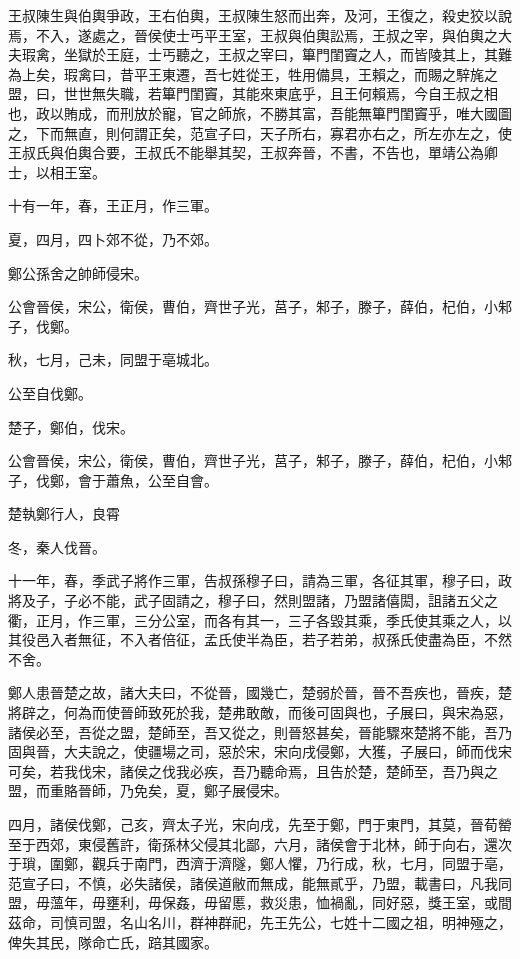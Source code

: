 \begin{pinyinscope}
王叔陳生與伯輿爭政，王右伯輿，王叔陳生怒而出奔，及河，王復之，殺史狡以說焉，不入，遂處之，晉侯使士丐平王室，王叔與伯輿訟焉，王叔之宰，與伯輿之大夫瑕禽，坐獄於王庭，士丐聽之，王叔之宰曰，篳門閨竇之人，而皆陵其上，其難為上矣，瑕禽曰，昔平王東遷，吾七姓從王，牲用備具，王賴之，而賜之騂旄之盟，曰，世世無失職，若篳門閨竇，其能來東底乎，且王何賴焉，今自王叔之相也，政以賄成，而刑放於寵，官之師旅，不勝其富，吾能無篳門閨竇乎，唯大國圖之，下而無直，則何謂正矣，范宣子曰，天子所右，寡君亦右之，所左亦左之，使王叔氏與伯輿合要，王叔氏不能舉其契，王叔奔晉，不書，不告也，單靖公為卿士，以相王室。

十有一年，春，王正月，作三軍。

夏，四月，四卜郊不從，乃不郊。

鄭公孫舍之帥師侵宋。

公會晉侯，宋公，衛侯，曹伯，齊世子光，莒子，邾子，滕子，薛伯，杞伯，小邾子，伐鄭。

秋，七月，己未，同盟于亳城北。

公至自伐鄭。

楚子，鄭伯，伐宋。

公會晉侯，宋公，衛侯，曹伯，齊世子光，莒子，邾子，滕子，薛伯，杞伯，小邾子，伐鄭，會于蕭魚，公至自會。

楚執鄭行人，良霄

冬，秦人伐晉。

十一年，春，季武子將作三軍，告叔孫穆子曰，請為三軍，各征其軍，穆子曰，政將及子，子必不能，武子固請之，穆子曰，然則盟諸，乃盟諸僖閎，詛諸五父之衢，正月，作三軍，三分公室，而各有其一，三子各毀其乘，季氏使其乘之人，以其役邑入者無征，不入者倍征，孟氏使半為臣，若子若弟，叔孫氏使盡為臣，不然不舍。

鄭人患晉楚之故，諸大夫曰，不從晉，國幾亡，楚弱於晉，晉不吾疾也，晉疾，楚將辟之，何為而使晉師致死於我，楚弗敢敵，而後可固與也，子展曰，與宋為惡，諸侯必至，吾從之盟，楚師至，吾又從之，則晉怒甚矣，晉能驟來楚將不能，吾乃固與晉，大夫說之，使疆場之司，惡於宋，宋向戌侵鄭，大獲，子展曰，師而伐宋可矣，若我伐宋，諸侯之伐我必疾，吾乃聽命焉，且告於楚，楚師至，吾乃與之盟，而重賂晉師，乃免矣，夏，鄭子展侵宋。

四月，諸侯伐鄭，己亥，齊太子光，宋向戌，先至于鄭，門于東門，其莫，晉荀罃至于西郊，東侵舊許，衛孫林父侵其北鄙，六月，諸侯會于北林，師于向右，還次于瑣，圍鄭，觀兵于南門，西濟于濟隧，鄭人懼，乃行成，秋，七月，同盟于亳，范宣子曰，不慎，必失諸侯，諸侯道敝而無成，能無貳乎，乃盟，載書曰，凡我同盟，毋薀年，毋壅利，毋保姦，毋留慝，救災患，恤禍亂，同好惡，獎王室，或間茲命，司慎司盟，名山名川，群神群祀，先王先公，七姓十二國之祖，明神殛之，俾失其民，隊命亡氏，踣其國家。


\end{pinyinscope}
